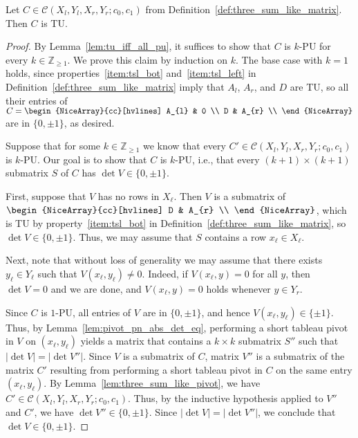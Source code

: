 \begin{lemma}\label{lem:three_sum_like_tu}
    Let $C \in \mathcal{C} (X_{l}, Y_{l}, X_{r}, Y_{r}; c_{0}, c_{1})$ from Definition~\ref{def:three_sum_like_matrix}. Then $C$ is TU.
\end{lemma}

\begin{proof}
    By Lemma~\ref{lem:tu_iff_all_pu}, it suffices to show that $C$ is $k$-PU for every $k \in \mathbb{Z}_{\geq 1}$. We prove this claim by induction on $k$. The base case with $k = 1$ holds, since properties~\ref{item:tsl_bot} and~\ref{item:tsl_left} in Definition~\ref{def:three_sum_like_matrix} imply that $A_{l}$, $A_{r}$, and $D$ are TU, so all their entries of $C = \begin{NiceArray}{cc}[hvlines] A_{l} & 0 \\ D & A_{r} \\ \end{NiceArray}$ are in $\{0, \pm 1\}$, as desired.

    Suppose that for some $k \in \mathbb{Z}_{\geq 1}$ we know that every $C' \in \mathcal{C} (X_{l}, Y_{l}, X_{r}, Y_{r}; c_{0}, c_{1})$ is $k$-PU. Our goal is to show that $C$ is $k$-PU, i.e., that every $(k + 1) \times (k + 1)$ submatrix $S$ of $C$ has $\det V \in \{0, \pm 1\}$.

    First, suppose that $V$ has no rows in $X_{\ell}$. Then $V$ is a submatrix of $\begin{NiceArray}{cc}[hvlines] D & A_{r} \\ \end{NiceArray}$, which is TU by property~\ref{item:tsl_bot} in Definition~\ref{def:three_sum_like_matrix}, so $\det V \in \{0, \pm 1\}$. Thus, we may assume that $S$ contains a row $x_{\ell} \in X_{\ell}$.

    Next, note that without loss of generality we may assume that there exists $y_{\ell} \in Y_{\ell}$ such that $V (x_{\ell}, y_{\ell}) \neq 0$. Indeed, if $V (x_{\ell}, y) = 0$ for all $y$, then $\det V = 0$ and we are done, and $V (x_{\ell}, y) = 0$ holds whenever $y \in Y_{r}$.

    Since $C$ is $1$-PU, all entries of $V$ are in $\{0, \pm 1\}$, and hence $V (x_{\ell}, y_{\ell}) \in \{\pm 1\}$. Thus, by Lemma~\ref{lem:pivot_pn_abs_det_eq}, performing a short tableau pivot in $V$ on $(x_{\ell}, y_{\ell})$ yields a matrix that contains a $k \times k$ submatrix $S''$ such that $|\det V| = |\det V''|$. Since $V$ is a submatrix of $C$, matrix $V''$ is a submatrix of the matrix $C'$ resulting from performing a short tableau pivot in $C$ on the same entry $(x_{\ell}, y_{\ell})$. By Lemma~\ref{lem:three_sum_like_pivot}, we have $C' \in \mathcal{C} (X_{l}, Y_{l}, X_{r}, Y_{r}; c_{0}, c_{1})$. Thus, by the inductive hypothesis applied to $V''$ and $C'$, we have $\det V'' \in \{0, \pm 1\}$. Since $|\det V| = |\det V''|$, we conclude that $\det V \in \{0, \pm 1\}$.
\end{proof}

